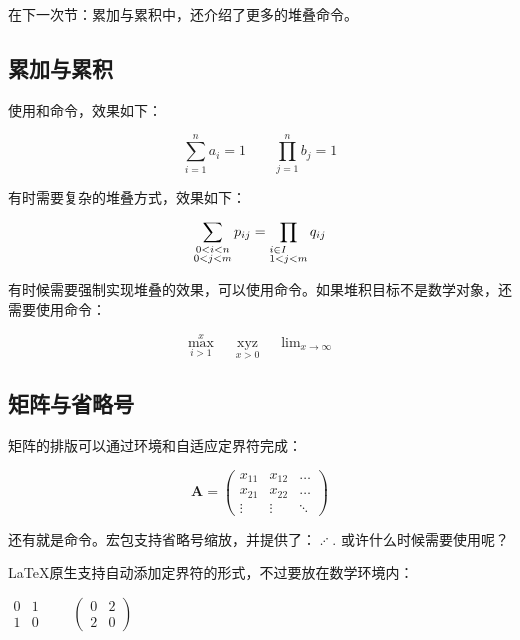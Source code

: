在下一次节：累加与累积中，还介绍了更多的堆叠命令。

\subsection{累加与累积}
使用和命令，效果如下：

\begin{codeshow}
\[\sum_{i=1}^{n}a_i=1 \qquad
\prod_{j=1}^{n}b_j=1\]
\end{codeshow}

有时需要复杂的堆叠方式，效果如下：

\begin{codeshow}
\[\sum_{\substack{0<i<n \\
  0<j<m}} p_{ij}=
  \prod_{\begin{subarray}{l}
  i\in I \\  1<j<m
  \end{subarray}}q_{ij}\]
\end{codeshow}

有时候需要强制实现堆叠的效果，可以使用命令。如果堆积目标不是数学对象，还需要使用命令：

\begin{codeshow}
\[\max\limits_{i>1}^{x}\quad
\mathop{xyz}\limits_{x>0}\quad
\lim\nolimits_{x\to \infty}\]
\end{codeshow}

\subsection{矩阵与省略号}
矩阵的排版可以通过环境和自适应定界符完成：

\begin{codeshow}
\[\mathbf{A}=
\left(\begin{array}{ccc}
x_{11} & x_{12} & \ldots \\
x_{21} & x_{22} & \ldots \\
\vdots & \vdots & \ddots
\end{array}\right)\]
\end{codeshow}

还有就是命令。宏包支持省略号缩放，并提供了：$\iddots$. 或许什么时候需要使用呢？

\LaTeX 原生支持自动添加定界符的形式，不过要放在数学环境内：
\begin{codeshow}
\centering $\begin{matrix}
0 & 1 \\ 1 & 0 \end{matrix}\qquad
\begin{pmatrix} 0 & 2 \\
2 & 0 \end{pmatrix}$
\end{codeshow}

